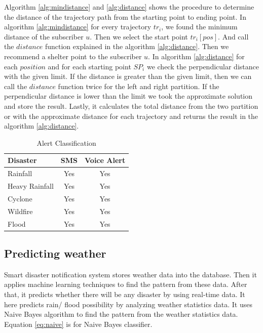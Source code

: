 \documentclass[conference]{IEEEtran}
\begin{document}
Algorithm \ref{alg:mindistance} and \ref{alg:distance} shows the procedure to determine the distance of the trajectory path from the starting point to ending point. In algorithm \ref{alg:mindistance} for every trajectory $tr_i$, we found the minimum distance of the subscriber $u$. Then we select the start point $tr_i$$[pos]$. And call the $distance$ function explained in the algorithm \ref{alg:distance}. Then we recommend a shelter point to the subscriber $u$.
In algorithm \ref{alg:distance} for each $position$ and for each starting point $SP_i$ we check the perpendicular distance with the given limit. If the distance is greater than the given limit, then we can call the $distance$ function twice for the left and right partition. If the perpendicular distance is lower than the limit we took the approximate solution and store the result. Lastly, it calculates the total distance from the two partition or with the approximate distance for each trajectory and returns the result in the algorithm \ref{alg:distance}.



\begin{table}[htp]
\centering
\caption{Alert Classification}

\begin{tabular}{|l|c|c|}
\hline
Disaster & SMS & Voice Alert \\
\hline
Rainfall & Yes & Yes \\
\hline
Heavy Rainfall & Yes & Yes  \\
\hline

Cyclone & Yes & Yes \\
\hline

Wildfire & Yes & Yes\\
\hline

Flood & Yes & Yes\\
\hline
\end{tabular}
\label{tab:alertclass}
\end{table}


\subsection{Predicting weather}
Smart disaster notification system stores weather data into the database. Then it applies machine learning techniques to find the pattern from these data. After that, it predicts whether there will be any disaster by using real-time data. It here predicts rain/ flood possibility by analyzing weather statistics data. It uses Naive Bayes algorithm to find the pattern from the weather statistics data. Equation \ref{eq:naive} is for Naive Bayes classifier. 
\end{document}
